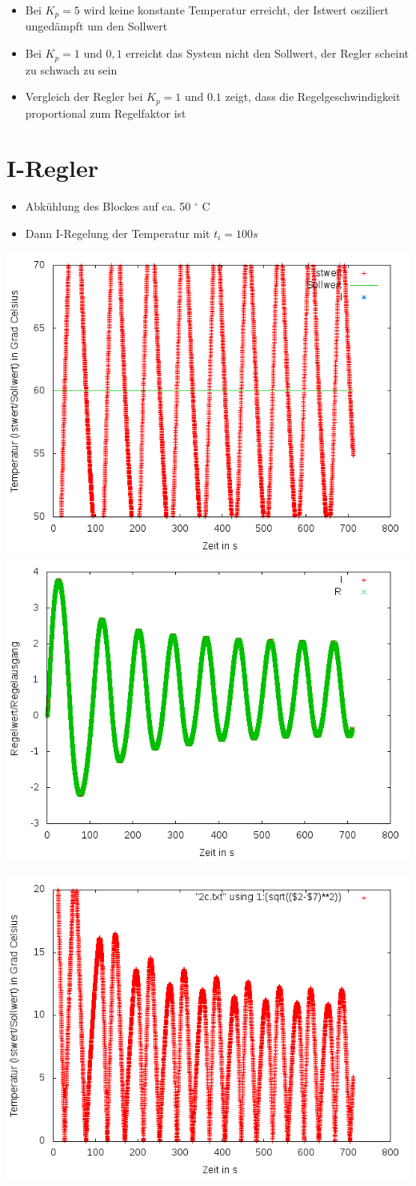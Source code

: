 \documentclass[compress,11pt]{beamer}
\begin{document}
\begin{frame}
\begin{itemize}
\item Bei $K_p = 5$ wird keine konstante Temperatur erreicht, der Istwert osziliert ungedämpft um den Sollwert
\item Bei $K_p = 1$ und $0,1$ erreicht das System nicht den Sollwert, der Regler scheint zu schwach zu sein
\item Vergleich der Regler bei $K_p = 1$ und $0.1$ zeigt, dass die Regelgeschwindigkeit proportional zum Regelfaktor ist 
\end{itemize}
\end{frame}
\section{I-Regler}
\begin{frame}
\begin{itemize}
\item Abkühlung des Blockes auf ca. 50 $^\circ$ C
\item Dann I-Regelung der Temperatur mit $t_i = 100 s$
\end{itemize}
\includegraphics[width=.5\textwidth]{../2aufgabe/2c1}
\includegraphics[width=.5\textwidth]{../2aufgabe/2c1_I}
\end{frame}
\begin{frame}
\includegraphics[width=.7\textwidth]{../2aufgabe/2c1_betrag}
\end{frame}
\end{document}
